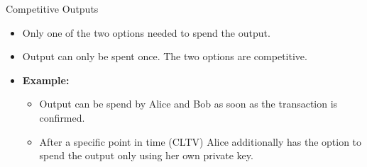 \documentclass[handout]{beamer}
\begin{document}
\begin{frame}{Competitive Outputs}
\begin{minipage}{0.3\textwidth}
\begin{figure}
		\end{figure}
	\end{minipage}%
	\hfill
	\begin{minipage}{0.6\textwidth}
		\begin{itemize}
			\item<1-> Only one of the two options needed to spend the output.
			\item<2-> Output can only be spent once. The two options are competitive.
			\vspace{0.25cm}
			\item<3-> \textbf{Example:}
			\begin{itemize}
				\item<3-> Output can be spend by Alice and Bob as soon as the transaction is confirmed.
				\item<4-> After a specific point in time (CLTV) Alice additionally has the option to spend the output only using her own private key.
			\end{itemize}
		\end{itemize}
	\end{minipage}
\end{frame}

\end{document}
